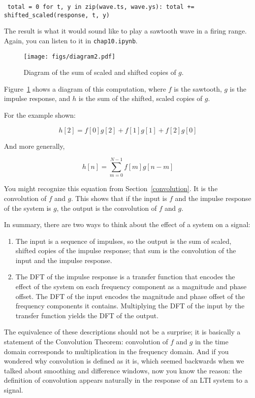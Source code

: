 \documentclass[12pt]{book} \usepackage[width=5.5in,height=8.5in, hmarginratio=3:2,vmarginratio=1:1]{geometry}
\begin{document}
\begin{verbatim} total = 0 for t, y in zip(wave.ts, wave.ys): total += shifted_scaled(response, t, y) \end{verbatim} 

The result is what it would sound like to play a sawtooth wave in a firing range. Again, you can listen to it in {\tt chap10.ipynb}. 

\begin{figure} \centerline{\texttt{[image: figs/diagram2.pdf]}} \caption{Diagram of the sum of scaled and shifted copies of $g$.} \label{fig.convolution} \end{figure} 

Figure~\ref{fig.convolution} shows a diagram of this computation, where $f$ is the sawtooth, $g$ is the impulse response, and $h$ is the sum of the shifted, scaled copies of $g$. 

For the example shown: 

\[ h[2] = f[0]g[2] + f[1]g[1] + f[2]g[0] \] 

And more generally, 

\[ h[n] = \sum_{m=0}^{N-1} f[m] g[n-m] \] 

You might recognize this equation from Section~\ref{convolution}. It is the convolution of $f$ and $g$. This shows that if the input is $f$ and the impulse response of the system is $g$, the output is the convolution of $f$ and $g$. 

In summary, there are two ways to think about the effect of a system on a signal: 

\begin{enumerate} 

\item The input is a sequence of impulses, so the output is the sum of scaled, shifted copies of the impulse response; that sum is the convolution of the input and the impulse response. 

\item The DFT of the impulse response is a transfer function that encodes the effect of the system on each frequency component as a magnitude and phase offset. The DFT of the input encodes the magnitude and phase offset of the frequency components it contains. Multiplying the DFT of the input by the transfer function yields the DFT of the output. 

\end{enumerate} 

The equivalence of these descriptions should not be a surprise; it is basically a statement of the Convolution Theorem: convolution of $f$ and $g$ in the time domain corresponds to multiplication in the frequency domain. And if you wondered why convolution is defined as it is, which seemed backwards when we talked about smoothing and difference windows, now you know the reason: the definition of convolution appears naturally in the response of an LTI system to a signal. 
\end{document}

